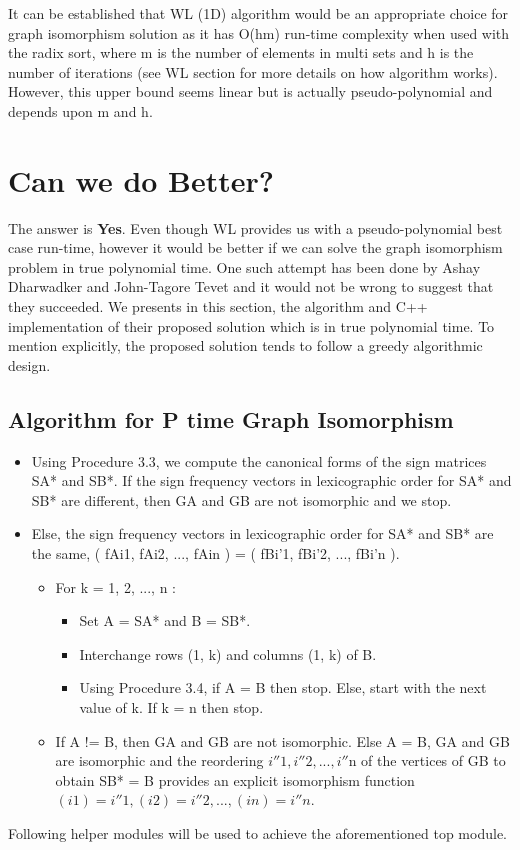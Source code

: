 \documentclass[11pt]{article}
\begin{document}
    It can be established that WL (1D) algorithm would be an appropriate choice for graph isomorphism solution as it has O(hm) run-time complexity when used with the radix sort, where m is the number of elements in multi sets and h is the number of iterations (see WL section for more details on how algorithm works). However, this upper bound seems linear but is actually pseudo-polynomial and depends upon m and h.
    

\section{Can we do Better?}
The answer is \textbf{Yes}. Even though WL provides us with a pseudo-polynomial best case run-time, however it would be better if we can solve the graph isomorphism problem in true polynomial time. One such attempt has been done by Ashay Dharwadker and John-Tagore Tevet and it would not be wrong to suggest that they succeeded. We presents in this section, the algorithm and C++ implementation of their proposed solution which is in true polynomial time. To mention explicitly, the proposed solution tends to follow a greedy algorithmic design. 
\subsection{Algorithm for P time Graph Isomorphism}
\begin{itemize}
  \item Using Procedure 3.3, we compute the canonical forms of the sign matrices SA* and SB*. If the sign frequency vectors in lexicographic order for SA* and SB* are different, then GA and GB are not isomorphic and we stop.
  \item Else, the sign frequency vectors in lexicographic order for SA* and SB* are the same, (  fAi1, fAi2, ..., fAin ) = (  fBi'1, fBi'2, ..., fBi'n ).
  \begin{itemize}
  \item For k = 1, 2, ..., n :
  \begin{itemize}
      \item Set A = SA* and  B = SB*.
      \item Interchange rows (1, k) and columns (1, k) of B.
      \item Using Procedure 3.4, if A = B then stop. Else, start with the next value of k. If k = n then stop.
  \end{itemize}
  \item If A  !=  B, then GA and GB are not isomorphic. Else A = B, GA and GB are isomorphic and the reordering $i''1, i''2, ..., i''$n of the vertices of GB to obtain SB* = B provides an explicit isomorphism function $(i1) = i''1, (i2) = i''2, ..., (in) = i''n.$
  \end{itemize}
\end{itemize}
Following helper modules will be used to achieve the aforementioned top module.
\end{document}
